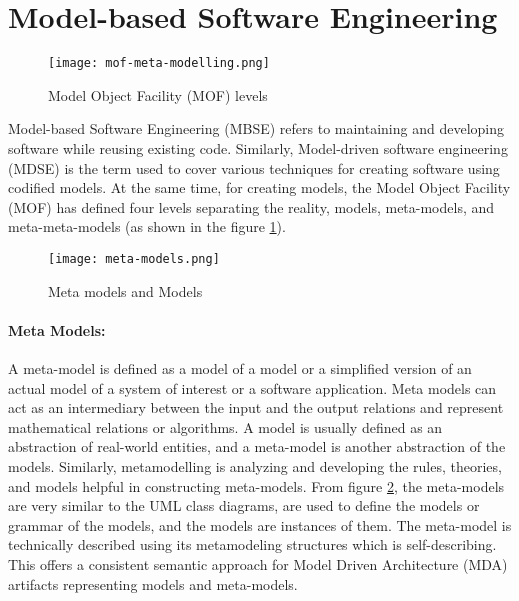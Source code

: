 \section{Model-based Software Engineering}
\label{background:section:mbse}
\begin{figure}[htbp!]
  \centering    
  \texttt{[image: mof-meta-modelling.png]}
  \caption[MOF levels]{Model Object Facility (MOF) levels}
  \label{fig:background:moflevels}
\end{figure}

Model-based Software Engineering (MBSE) refers to maintaining and developing software while reusing existing code.
Similarly, Model-driven software engineering (MDSE) is the term used to cover various techniques for creating software using codified models.
At the same time, for creating models, the Model Object Facility (MOF) has defined four levels separating the reality, models, meta-models, and meta-meta-models (as shown in the figure \ref{fig:background:moflevels}).
\begin{figure}[htbp!]
  \centering    
  \texttt{[image: meta-models.png]}
  \caption[Meta models]{Meta models and Models}
  \label{fig:background:m1m2}
\end{figure}

\paragraph{Meta Models:} 
A meta-model is defined as a model of a model or a simplified version of an actual model of a system of interest or a software application.
Meta models can act as an intermediary between the input and the output relations and represent mathematical relations or algorithms.
A model is usually defined as an abstraction of real-world entities, and a meta-model is another abstraction of the models. 
Similarly, metamodelling is analyzing and developing the rules, theories, and models helpful in constructing meta-models.
From figure \ref{fig:background:m1m2}, the meta-models are very similar to the UML class diagrams, are used to define the models or grammar of the models, and the models are instances of them. 
The meta-model is technically described using its metamodeling structures which is self-describing. 
This offers a consistent semantic approach for Model Driven Architecture (MDA) artifacts representing models and meta-models.

